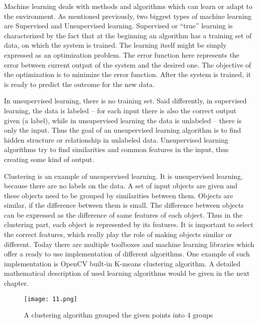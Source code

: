     Machine learning deals with methods and algorithms which can learn or adapt to the environment. As mentioned previously, two biggest types of machine learning are Supervised and Unsupervised learning. Supervised or ``true'' learning is characterized by the fact that at the beginning an algorithm has a training set of data, on which the system is trained. The learning itself might be simply expressed as an optimization problem. The error function here represents the error between current output of the system and the desired one. The objective of the optimization is to minimize the error function. After the system is trained, it is ready to predict the outcome for the new data. 

    In unsupervised learning, there is no training set. Said differently, in supervised learning, the data is labeled -- for each input there is also the correct output given (a label), while in unsupervised learning the data is unlabeled -- there is only the input. Thus the goal of an unsupervised learning algorithm is to find hidden structure or relationship in unlabeled data. Unsupervised learning algorithms try to find similarities and common features in the input, thus creating some kind of output. 
        
    Clustering is an example of unsupervised learning. It is unsupervised learning, because there are no labels on the data. A set of input objects are given and these objects need to be grouped by similarities between them. Objects are similar, if the difference between them is small. The difference between objects can be expressed as the difference of same features of each object. Thus in the clustering part, each object is represented by its features. It is important to select the correct features, which really play the role of making objects similar or different. Today there are multiple toolboxes and machine learning libraries which offer a ready to use implementation of different algorithms. One example of such implementation is OpenCV built-in K-means clustering algorithm.  A detailed mathematical description of used learning algorithms would be given in the next chapter.
          \begin{figure}[hb!]
        \centering
        \texttt{[image: 11.png]} 
        \caption{A clustering algorithm grouped the given points into 4 groups}
        \label{clusters}
      \end{figure}

\clearpage